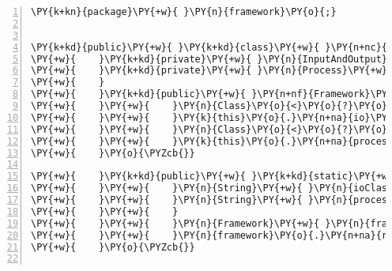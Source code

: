 \begin{Verbatim}[commandchars=\\\{\},numbers=left,firstnumber=1,stepnumber=1,frame=single,fontsize=\small]
\PY{k+kn}{package}\PY{+w}{ }\PY{n}{framework}\PY{o}{;}


\PY{k+kd}{public}\PY{+w}{ }\PY{k+kd}{class}\PY{+w}{ }\PY{n+nc}{Framework}\PY{+w}{ }\PY{o}{\PYZob{}}
\PY{+w}{    }\PY{k+kd}{private}\PY{+w}{ }\PY{n}{InputAndOutput}\PY{+w}{ }\PY{n}{io}\PY{o}{;}
\PY{+w}{    }\PY{k+kd}{private}\PY{+w}{ }\PY{n}{Process}\PY{+w}{ }\PY{n}{process}\PY{o}{;}
\PY{+w}{    }
\PY{+w}{    }\PY{k+kd}{public}\PY{+w}{ }\PY{n+nf}{Framework}\PY{o}{(}\PY{n}{String}\PY{+w}{ }\PY{n}{ioClass}\PY{o}{,}\PY{+w}{ }\PY{n}{String}\PY{+w}{ }\PY{n}{processClass}\PY{o}{)}\PY{+w}{ }\PY{k+kd}{throws}\PY{+w}{ }\PY{n}{ClassNotFoundException}\PY{o}{,}\PY{+w}{ }\PY{n}{InstantiationException}\PY{o}{,}\PY{+w}{ }\PY{n}{IllegalAccessException}\PY{+w}{ }\PY{o}{\PYZob{}}
\PY{+w}{    }\PY{+w}{    }\PY{n}{Class}\PY{o}{<}\PY{o}{?}\PY{o}{>}\PY{+w}{ }\PY{n}{io}\PY{+w}{ }\PY{o}{=}\PY{+w}{ }\PY{n}{Class}\PY{o}{.}\PY{n+na}{forName}\PY{o}{(}\PY{n}{ioClass}\PY{o}{)}\PY{o}{;}
\PY{+w}{    }\PY{+w}{    }\PY{k}{this}\PY{o}{.}\PY{n+na}{io}\PY{+w}{ }\PY{o}{=}\PY{+w}{ }\PY{o}{(}\PY{n}{InputAndOutput}\PY{o}{)}\PY{+w}{ }\PY{n}{io}\PY{o}{.}\PY{n+na}{newInstance}\PY{o}{(}\PY{o}{)}\PY{o}{;}
\PY{+w}{    }\PY{+w}{    }\PY{n}{Class}\PY{o}{<}\PY{o}{?}\PY{o}{>}\PY{+w}{ }\PY{n}{process}\PY{+w}{ }\PY{o}{=}\PY{+w}{ }\PY{n}{Class}\PY{o}{.}\PY{n+na}{forName}\PY{o}{(}\PY{n}{processClass}\PY{o}{)}\PY{o}{;}
\PY{+w}{    }\PY{+w}{    }\PY{k}{this}\PY{o}{.}\PY{n+na}{process}\PY{+w}{ }\PY{o}{=}\PY{+w}{ }\PY{o}{(}\PY{n}{Process}\PY{o}{)}\PY{+w}{ }\PY{n}{process}\PY{o}{.}\PY{n+na}{newInstance}\PY{o}{(}\PY{o}{)}\PY{o}{;}
\PY{+w}{    }\PY{o}{\PYZcb{}}

\PY{+w}{    }\PY{k+kd}{public}\PY{+w}{ }\PY{k+kd}{static}\PY{+w}{ }\PY{k+kt}{void}\PY{+w}{ }\PY{n+nf}{main}\PY{o}{(}\PY{n}{String}\PY{o}{[}\PY{o}{]}\PY{+w}{ }\PY{n}{args}\PY{o}{)}\PY{+w}{ }\PY{k+kd}{throws}\PY{+w}{ }\PY{n}{Exception}\PY{+w}{ }\PY{o}{\PYZob{}}
\PY{+w}{    }\PY{+w}{    }\PY{n}{String}\PY{+w}{ }\PY{n}{ioClass}\PY{+w}{ }\PY{o}{=}\PY{+w}{ }\PY{n}{args}\PY{o}{[}\PY{l+m+mi}{0}\PY{o}{]}\PY{o}{;}
\PY{+w}{    }\PY{+w}{    }\PY{n}{String}\PY{+w}{ }\PY{n}{processClass}\PY{+w}{ }\PY{o}{=}\PY{+w}{ }\PY{n}{args}\PY{o}{[}\PY{l+m+mi}{1}\PY{o}{]}\PY{o}{;}
\PY{+w}{    }\PY{+w}{    }
\PY{+w}{    }\PY{+w}{    }\PY{n}{Framework}\PY{+w}{ }\PY{n}{framework}\PY{+w}{ }\PY{o}{=}\PY{+w}{ }\PY{k}{new}\PY{+w}{ }\PY{n}{Framework}\PY{o}{(}\PY{n}{ioClass}\PY{o}{,}\PY{+w}{ }\PY{n}{processClass}\PY{o}{)}\PY{o}{;}
\PY{+w}{    }\PY{+w}{    }\PY{n}{framework}\PY{o}{.}\PY{n+na}{run}\PY{o}{(}\PY{o}{)}\PY{o}{;}
\PY{+w}{    }\PY{o}{\PYZcb{}}


\end{Verbatim}
